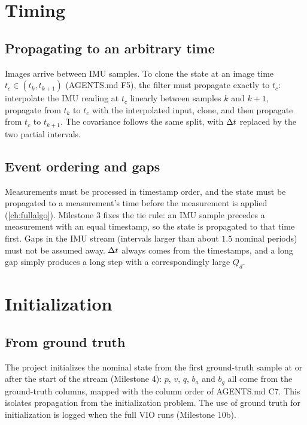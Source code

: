 \section{Timing}

\subsection{Propagating to an arbitrary time}

Images arrive between IMU samples. To clone the state at an image time $t_c \in (t_k, t_{k+1})$ (AGENTS.md F5), the
filter must propagate exactly to $t_c$: interpolate the IMU reading at $t_c$ linearly between samples $k$ and
$k+1$, propagate from $t_k$ to $t_c$ with the interpolated input, clone, and then propagate from $t_c$ to $t_{k+1}$.
The covariance follows the same split, with ${\Delta t}$ replaced by the two partial intervals.

\subsection{Event ordering and gaps}

Measurements must be processed in timestamp order, and the state must be propagated to a measurement's time
before the measurement is applied (\cref{ch:fullalgo}). Milestone 3 fixes the tie rule: an IMU sample precedes a
measurement with an equal timestamp, so the state is propagated to that time first. Gaps in the IMU stream
(intervals larger than about $1.5$ nominal periods) must not be assumed away. ${\Delta t}$ always comes from the
timestamps, and a long gap simply produces a long step with a correspondingly large $Q_d$.

\section{Initialization}

\subsection{From ground truth}

The project initializes the nominal state from the first ground-truth sample at or after the start of the
stream (Milestone 4): $p$, $v$, $q$, $b_a$ and $b_g$ all come from the ground-truth columns, mapped with the
column order of AGENTS.md C7. This isolates propagation from the initialization problem. The use of ground
truth for initialization is logged when the full VIO runs (Milestone 10b).

